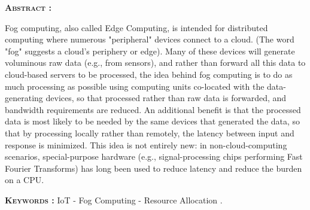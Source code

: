 \textsc{\textbf{Abstract :}}

Fog computing, also called Edge Computing, is intended for distributed computing where numerous "peripheral" devices connect to a cloud. (The word "fog" suggests a cloud's periphery or edge). Many of these devices will generate voluminous raw data (e.g., from sensors), and rather than forward all this data to cloud-based servers to be processed, the idea behind fog computing is to do as much processing as possible using computing units co-located with the data-generating devices, so that processed rather than raw data is forwarded, and bandwidth requirements are reduced. An additional benefit is that the processed data is most likely to be needed by the same devices that generated the data, so that by processing locally rather than remotely, the latency between input and response is minimized. This idea is not entirely new: in non-cloud-computing scenarios, special-purpose hardware (e.g., signal-processing chips performing Fast Fourier Transforms) has long been used to reduce latency and reduce the burden on a CPU.

\textsc{\textbf{Keywords :}} IoT - Fog Computing - Resource Allocation .\\ \\